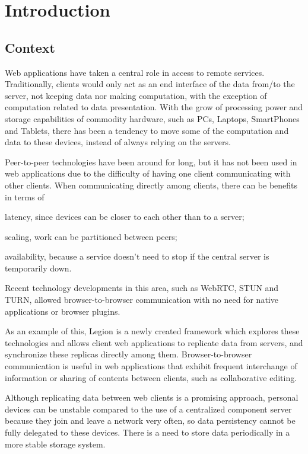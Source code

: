 \chapter{Introduction}
\label{cha:introduction}

\section{Context}
\label{sec:context}
Web applications have taken a central role in access to remote services. Traditionally, clients would only act as an end interface of the data from/to the server, not keeping data nor making computation, with the exception of computation related to data presentation. With the grow of processing power and storage capabilities of commodity hardware, such as PCs, Laptops, SmartPhones and Tablets, there has been a tendency to move some of the computation and data to these devices, instead of always relying on the servers.\par
	Peer-to-peer technologies have been around for long, but it has not been used in web applications due to the difficulty of having one client communicating with other clients. When communicating directly among clients, there can be benefits in terms of \begin{enumerate*}[(i)]
	\item latency, since devices can be closer to each other than to a server;
	\item scaling, work can be partitioned between peers;
	\item availability, because a service doesn't need to stop if the central server is temporarily down.\end{enumerate*}
Recent technology developments in this area, such as WebRTC, STUN and TURN, allowed  browser-to-browser communication with no need for native applications or browser plugins.\par
	As an example of this, Legion is a newly created framework which explores these technologies and allows client web applications to replicate data from servers, and synchronize these replicas directly among them. Browser-to-browser communication is useful in web applications that exhibit frequent interchange of information or sharing of contents between clients, such as collaborative editing.\par
	Although replicating data between web clients is a promising approach, personal devices can be unstable compared to the use of a centralized component server because they join and leave a network very often, so data persistency cannot be fully delegated to these devices. There is a need to store data periodically in a more stable storage system.


